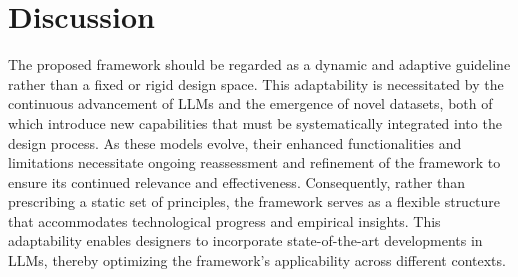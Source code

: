 \documentclass{article}
\begin{document}
\section{Discussion}
The proposed framework should be regarded as a dynamic and adaptive guideline rather than a fixed or rigid design space. This adaptability is necessitated by the continuous advancement of LLMs and the emergence of novel datasets, both of which introduce new capabilities that must be systematically integrated into the design process. As these models evolve, their enhanced functionalities and limitations necessitate ongoing reassessment and refinement of the framework to ensure its continued relevance and effectiveness. Consequently, rather than prescribing a static set of principles, the framework serves as a flexible structure that accommodates technological progress and empirical insights. This adaptability enables designers to incorporate state-of-the-art developments in LLMs, thereby optimizing the framework's applicability across different contexts. 
\newpage

\end{document}
